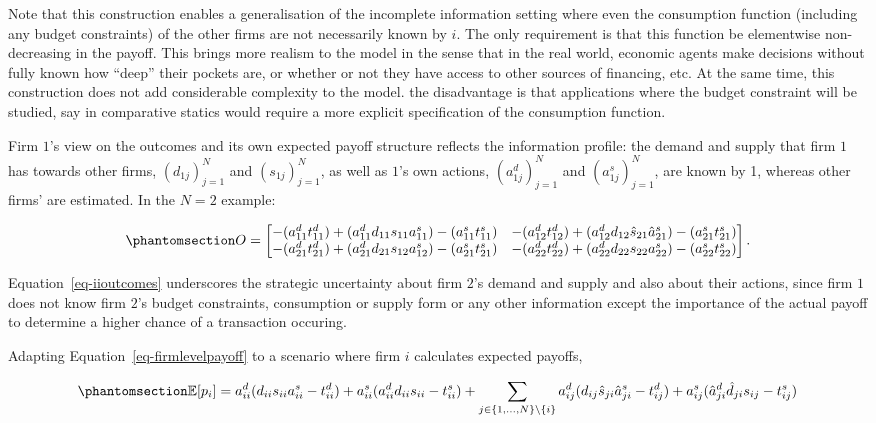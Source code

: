 \documentclass[
]{article}
\theoremstyle{definition}
\theoremstyle{plain}
\theoremstyle{remark}
\begin{document}
Note that this construction enables a generalisation of the incomplete
information setting where even the consumption function (including any
budget constraints) of the other firms are not necessarily known by
\(i\). The only requirement is that this function be elementwise
non-decreasing in the payoff. This brings more realism to the model in
the sense that in the real world, economic agents make decisions without
fully known how ``deep'' their pockets are, or whether or not they have
access to other sources of financing, etc. At the same time, this
construction does not add considerable complexity to the model. the
disadvantage is that applications where the budget constraint will be
studied, say in comparative statics would require a more explicit
specification of the consumption function.

Firm \(1\)'s view on the outcomes and its own expected payoff structure
reflects the information profile: the demand and supply that firm \(1\)
has towards other firms, \((d_{1j})_{j=1}^N\) and \((s_{1j})_{j=1}^N\),
as well as \(1\)'s own actions, \((a_{1j}^d)_{j=1}^N\) and
\((a_{1j}^s)_{j=1}^N\), are known by 1, whereas other firms' are
estimated. In the \(N=2\) example:

\begin{equation}\phantomsection\label{eq-iioutcomes}{
O = 
\begin{bmatrix}
-(a_{11}^d t_{11}^d) + (a_{11}^d d_{11} s_{11} a_{11}^s) - (a_{11}^s t_{11}^s) & -(a_{12}^d t_{12}^d) + (a_{12}^d d_{12} \hat{s}_{21} \hat{a}_{21}^s) - (a_{21}^s t_{21}^s)\\
-(a_{21}^d t_{21}^d) + (a_{21}^d d_{21} s_{12} a_{12}^s) - (a_{21}^s t_{21}^s) & -(a_{22}^d t_{22}^d) + (a_{22}^d d_{22} s_{22} a_{22}^s) - (a_{22}^s t_{22}^s)
\end{bmatrix}.
}\end{equation}

Equation~\ref{eq-iioutcomes} underscores the strategic uncertainty about
firm \(2\)'s demand and supply and also about their actions, since firm
\(1\) does not know firm \(2\)'s budget constraints, consumption or
supply form or any other information except the importance of the actual
payoff to determine a higher chance of a transaction occuring.

Adapting Equation~\ref{eq-firmlevelpayoff} to a scenario where firm
\(i\) calculates expected payoffs,

\begin{equation}\phantomsection\label{eq-iifirmlevelpayoff}{
\mathbb{E}[p_i] = a_{ii}^d (d_{ii} s_{ii} a_{ii}^s - t_{ii}^d) + a_{ii}^s (a_{ii}^d d_{ii} s_{ii} - t_{ii}^s) + \sum_{j \in \{1, \dots, N\}\setminus \{i\}} a_{ij}^d (d_{ij} \hat{s}_{ji} \hat{a}_{ji}^s - t_{ij}^d) + a_{ij}^s (\hat{a}_{ji}^d \hat{d}_{ji} s_{ij} - t_{ij}^s)
}\end{equation}
\end{document}
